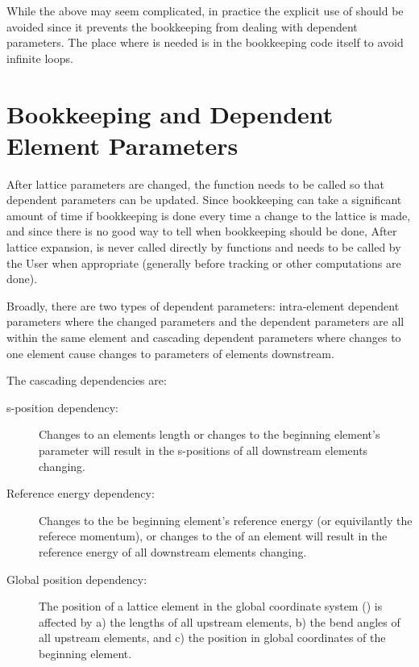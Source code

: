 While the above may seem complicated, in practice the explicit use of  should be avoided
since it prevents the bookkeeping from dealing with dependent parameters.
The place where  is needed is in the bookkeeping code itself to avoid infinite loops.
 

\section{Bookkeeping and Dependent Element Parameters}
\label{s:param.depend}

After lattice parameters are changed, the function  needs to be called
so that dependent parameters can be updated. 
Since bookkeeping can take a significant amount of time if bookkeeping is done every time
a change to the lattice is made, and since there is no good way to tell when bookkeeping should
be done, After lattice expansion,  is never called directly by \accellat 
functions and needs to be called by the User when appropriate (generally before tracking or
other computations are done).

Broadly, there are two types of dependent parameters: intra-element dependent parameters where
the changed parameters and the dependent parameters are all within the same element and
cascading dependent parameters where changes to one element cause changes to parameters of 
elements downstream.

The cascading dependencies are:
\begin{description}
%
\item [s-position dependency:]
Changes to an elements length  or changes to the beginning element's  parameter will
result in the s-positions of all downstream elements changing.
%
\item [Reference energy dependency:] Changes to the be beginning element's reference energy (or
equivilantly the referece momentum), or changes to the  of an  element
will result in the reference energy of all downstream elements changing.
%
\item[Global position dependency:]
The position of a lattice element in the global coordinate system () is affected
by a) the lengths of all upstream elements, b) the bend angles of all upstream elements, and c)
the position in global coordinates of the beginning element.
\end{description}


